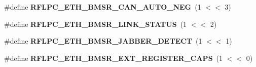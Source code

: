 \begin{DoxyCompactItemize}
\item 
\hypertarget{group__eth_ga787094252e9d10a26492ee9934c336eb}{\#define {\bfseries R\-F\-L\-P\-C\-\_\-\-E\-T\-H\-\_\-\-B\-M\-S\-R\-\_\-\-C\-A\-N\-\_\-\-A\-U\-T\-O\-\_\-\-N\-E\-G}~(1 $<$$<$ 3)}\label{group__eth_ga787094252e9d10a26492ee9934c336eb}

\item 
\hypertarget{group__eth_gaec99ec78744270f04c9f9b2be14d9ac1}{\#define {\bfseries R\-F\-L\-P\-C\-\_\-\-E\-T\-H\-\_\-\-B\-M\-S\-R\-\_\-\-L\-I\-N\-K\-\_\-\-S\-T\-A\-T\-U\-S}~(1 $<$$<$ 2)}\label{group__eth_gaec99ec78744270f04c9f9b2be14d9ac1}

\item 
\hypertarget{group__eth_ga33267c62aff2dd9775fb92f548481345}{\#define {\bfseries R\-F\-L\-P\-C\-\_\-\-E\-T\-H\-\_\-\-B\-M\-S\-R\-\_\-\-J\-A\-B\-B\-E\-R\-\_\-\-D\-E\-T\-E\-C\-T}~(1 $<$$<$ 1)}\label{group__eth_ga33267c62aff2dd9775fb92f548481345}

\item 
\hypertarget{group__eth_ga0dc00ef81d0f4ea3b01245b410cebf17}{\#define {\bfseries R\-F\-L\-P\-C\-\_\-\-E\-T\-H\-\_\-\-B\-M\-S\-R\-\_\-\-E\-X\-T\-\_\-\-R\-E\-G\-I\-S\-T\-E\-R\-\_\-\-C\-A\-P\-S}~(1 $<$$<$ 0)}\label{group__eth_ga0dc00ef81d0f4ea3b01245b410cebf17}

\end{DoxyCompactItemize}
